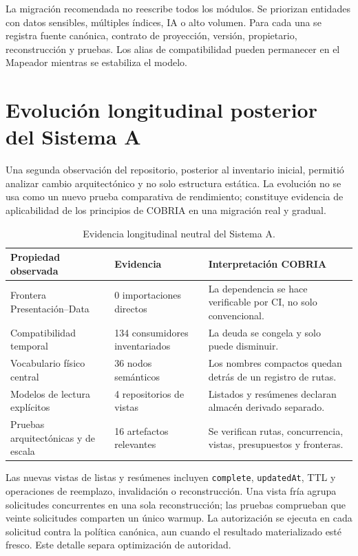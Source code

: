 La migración recomendada no reescribe todos los módulos. Se priorizan entidades con
datos sensibles, múltiples índices, IA o alto volumen. Para cada una se registra fuente
canónica, contrato de proyección, versión, propietario, reconstrucción y pruebas. Los
alias de compatibilidad pueden permanecer en el Mapeador mientras se estabiliza el modelo.

\section{Evolución longitudinal posterior del Sistema A}

Una segunda observación del repositorio, posterior al inventario inicial, permitió
analizar cambio arquitectónico y no solo estructura estática. La evolución no se usa
como un nuevo prueba comparativa de rendimiento; constituye evidencia de aplicabilidad de los
principios de COBRIA en una migración real y gradual.

\begin{table}[H]
\centering
\caption{Evidencia longitudinal neutral del Sistema A.}
\label{tab:evolucion-sistema-a}
\begin{tabularx}{\textwidth}{p{4.1cm}p{2.3cm}X}
\toprule
Propiedad observada & Evidencia & Interpretación COBRIA \\
\midrule
Frontera Presentación--Data & 0 importaciones directos & La dependencia se hace verificable
por CI, no solo convencional.\\
Compatibilidad temporal & 134 consumidores inventariados & La deuda se congela y solo
puede disminuir.\\
Vocabulario físico central & 36 nodos semánticos & Los nombres compactos quedan detrás
de un registro de rutas.\\
Modelos de lectura explícitos & 4 repositorios de vistas & Listados y resúmenes declaran
almacén derivado separado.\\
Pruebas arquitectónicas y de escala & 16 artefactos relevantes & Se verifican rutas,
concurrencia, vistas, presupuestos y fronteras.\\
\bottomrule
\end{tabularx}
\end{table}

Las nuevas vistas de listas y resúmenes incluyen \texttt{complete},
\texttt{updatedAt}, TTL y operaciones de reemplazo, invalidación o reconstrucción.
Una vista fría agrupa solicitudes concurrentes en una sola reconstrucción; las pruebas
comprueban que veinte solicitudes comparten un único warmup. La autorización se ejecuta
en cada solicitud contra la política canónica, aun cuando el resultado materializado
esté fresco. Este detalle separa optimización de autoridad.

